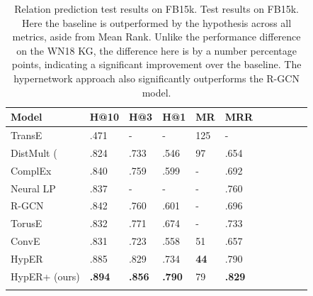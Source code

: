 \begin{table}[H]
		\centering
		\begin{tabular}{lllllllllll}
  			\textbf{Model} & \textbf{H@10} & \textbf{H@3} & \textbf{H@1} & \textbf{MR} & \textbf{MRR} \\
  			\hline
  			TransE \unskip~\citep{bordes2013translating} & .471 & - & - & 125 & - \\
  			DistMult (\unskip~\citep{yang2014embedding} & .824 & .733 & .546 & 97 & .654 \\
  			ComplEx \unskip~\citep{trouillon2016complex} & .840 & .759 & .599 & - & .692 \\
  			Neural LP \unskip~\citep{yang2017differentiable} & .837 & - & - & - & .760 \\
			R-GCN \unskip~\citep{schlichtkrull2018modeling} & .842 & .760 & .601 & - & .696 \\
			TorusE \unskip~\citep{ebisu2018toruse} & .832 & .771 & .674 & - & .733\\
			ConvE \unskip~\citep{dettmers2018convolutional} & .831 & .723 & .558 & 51 & .657 \\
			HypER \unskip~\citep{balazevic2019hypernetwork} & .885 & .829 & .734 & \textbf{44} & .790 \\
  			\hline
  			HypER+ (ours) & \textbf{.894} & \textbf{.856} & \textbf{.790} & 79 & \textbf{.829} \\
			&
		\end{tabular}
		\captionsetup{justification=centering}
		\caption{Relation prediction test results on FB15k. Test results on FB15k. Here the baseline is outperformed by the hypothesis across all metrics, aside from Mean Rank. Unlike the performance difference on the WN18 KG, the difference here is by a number percentage points, indicating a significant improvement over the baseline. The hypernetwork approach also significantly outperforms the R-GCN model.}
\end{table}


